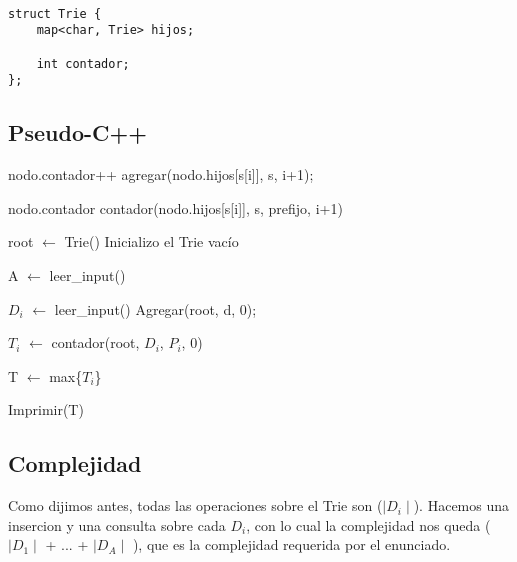 
\begin{lstlisting}
	
struct Trie {
	map<char, Trie> hijos;
	
	int contador;
};

\end{lstlisting}

\subsection{Pseudo-C++}

\begin{algorithmic}
	
		\State nodo.contador++
			\State \Return
		\Else
			\State agregar(nodo.hijos[s[i]], s, i+1);
		\EndIf

	\EndFunction
	
	\vspace{2em}

			\State \Return nodo.contador
		\Else
			\State \Return contador(nodo.hijos[s[i]], s, prefijo, i+1)
		\EndIf
	\EndFunction

	\vspace{2em}

		\State root $\gets$ Trie() \Comment Inicializo el Trie vacío

		\State A $\gets$ leer_input()

			\State $D_i$ $\gets$ leer_input()
			\State Agregar(root, d, 0);

		\EndFor

			\State $T_i$ $\gets$ contador(root, $D_i$, $P_i$, 0)
		\EndFor

		\State T $\gets$ max\{$T_i$\}

		\State Imprimir(T)

	\EndFunction





\end{algorithmic}

\subsection{Complejidad}

Como dijimos antes, todas las operaciones sobre el Trie son \bigo($\mid D_i \mid$). Hacemos una insercion y una consulta sobre cada $D_i$, con lo cual la complejidad nos queda
\bigo($\mid D_1 \mid$ + ... + $\mid D_A \mid$ ), que es la complejidad requerida por el enunciado. 